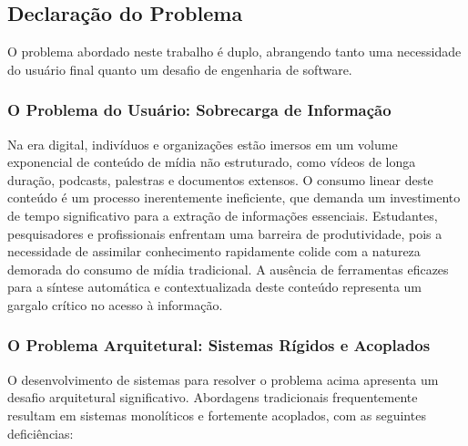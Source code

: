 \subsection{Declaração do Problema}
\label{sec:problema}

O problema abordado neste trabalho é duplo, abrangendo tanto uma necessidade do usuário final quanto um desafio de engenharia de software.

\subsubsection{O Problema do Usuário: Sobrecarga de Informação}

Na era digital, indivíduos e organizações estão imersos em um volume exponencial de conteúdo de mídia não estruturado, como vídeos de longa duração, podcasts, palestras e documentos extensos. O consumo linear deste conteúdo é um processo inerentemente ineficiente, que demanda um investimento de tempo significativo para a extração de informações essenciais. Estudantes, pesquisadores e profissionais enfrentam uma barreira de produtividade, pois a necessidade de assimilar conhecimento rapidamente colide com a natureza demorada do consumo de mídia tradicional. A ausência de ferramentas eficazes para a síntese automática e contextualizada deste conteúdo representa um gargalo crítico no acesso à informação.

\subsubsection{O Problema Arquitetural: Sistemas Rígidos e Acoplados}

O desenvolvimento de sistemas para resolver o problema acima apresenta um desafio arquitetural significativo. Abordagens tradicionais frequentemente resultam em sistemas monolíticos e fortemente acoplados, com as seguintes deficiências:

